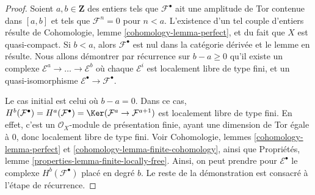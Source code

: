 \begin{proof}
Soient $a, b \in \mathbf{Z}$ des entiers tels que $\mathcal{F}^\bullet$
ait une amplitude de Tor contenue dans $[a, b]$ et tels que $\mathcal{F}^n = 0$ pour
$n < a$. L'existence d'un tel couple d'entiers
résulte de Cohomologie, lemme \ref{cohomology-lemma-perfect},
et du fait que $X$ est quasi-compact.
Si $b < a$, alors $\mathcal{F}^\bullet$ est nul dans la
catégorie dérivée et le lemme en résulte.
Nous allons démontrer par récurrence sur
$b - a \geq 0$ qu'il existe un complexe
$\mathcal{E}^a \to \ldots \to \mathcal{E}^b$
où chaque $\mathcal{E}^i$ est localement libre de type fini,
et un quasi-isomorphisme $\mathcal{E}^\bullet \to \mathcal{F}^\bullet$.

\medskip\noindent
Le cas initial est celui où $b - a = 0$. Dans ce cas,
$H^b(\mathcal{F}^\bullet) = H^a(\mathcal{F}^\bullet) =
\Ker(\mathcal{F}^a \to \mathcal{F}^{a + 1})$
est localement libre de type fini. En effet, c'est un
$\mathcal{O}_X$-module de présentation finie, ayant une dimension de Tor égale à $0$, donc
localement libre de type fini. Voir Cohomologie, lemmes \ref{cohomology-lemma-perfect} et
\ref{cohomology-lemma-finite-cohomology}, ainsi que
Propriétés, lemme \ref{properties-lemma-finite-locally-free}.
Ainsi, on peut prendre pour $\mathcal{E}^\bullet$ le complexe
$H^b(\mathcal{F}^\bullet)$ placé en degré $b$.
Le reste de la démonstration est consacré à l'étape de récurrence.


\end{proof}
